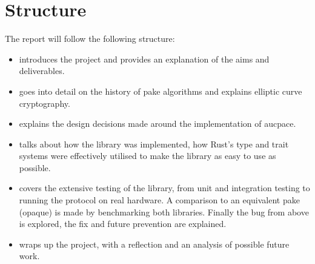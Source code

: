 \section{Structure}
The report will follow the following structure:
\begin{itemize}
    \item{ introduces the project and provides an explanation of the aims and deliverables.}
    \item{ goes into detail on the history of \gls{pake} algorithms and explains elliptic curve cryptography.}
    \item{ explains the design decisions made around the implementation of \gls{aucpace}.}
    \item{ talks about how the library was implemented, how Rust's type and trait systems were effectively utilised to make the library as easy to use as possible.}
    \item{ covers the extensive testing of the library, from unit and integration testing to running the protocol on real hardware. A comparison to an equivalent \gls{pake} (\gls{opaque}) is made by benchmarking both libraries. Finally the bug from above is explored, the fix and future prevention are explained.}
    \item{ wraps up the project, with a reflection and an analysis of possible future work.}
\end{itemize}
